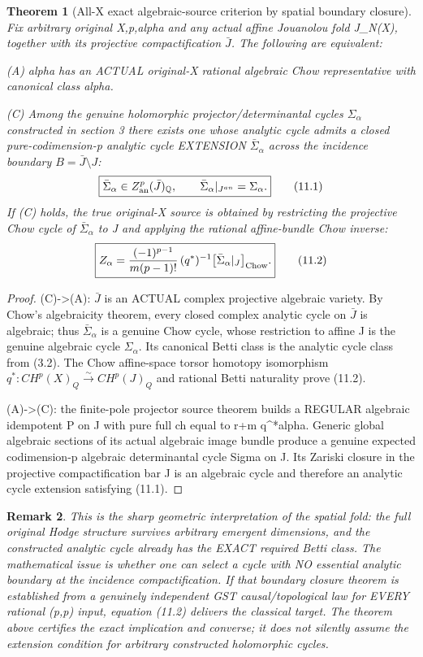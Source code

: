 \documentclass[11pt]{article}
\newtheorem{theorem}{Theorem}[section]
\newtheorem{remark}[theorem]{Remark}
\begin{document}
\begin{theorem}[All-X exact algebraic-source criterion by spatial boundary closure]
Fix arbitrary original X,p,alpha and
any actual affine Jouanolou fold
J_N(X), together with its projective
compactification $\bar J$.
The following are equivalent:

(A) alpha has an ACTUAL
original-X rational algebraic Chow
representative with canonical class alpha.

(C) Among the genuine holomorphic
projector/determinantal cycles
$\Sigma_\alpha$ constructed
in section 3 there exists one
whose analytic cycle admits a
closed pure-codimension-p analytic
cycle EXTENSION $\bar\Sigma_\alpha$
across the incidence boundary
$B=\bar J\setminus J$:
\[
 \boxed{
 \bar\Sigma_\alpha\in Z^p_{\rm an}(\bar J)_{\mathbb Q},
 \qquad
 \bar\Sigma_\alpha|_{J^{an}}
        =\Sigma_\alpha .
 }                                                        \tag{11.1}
\]
If (C) holds, the true original-X
source is obtained by restricting
the projective Chow cycle of
$\bar\Sigma_\alpha$ to J and applying
the rational affine-bundle Chow inverse:
\[
 \boxed{
 Z_\alpha=
 \frac{(-1)^{p-1}}{m(p-1)!}\,
     (q^*)^{-1} \bigl[
       \bar\Sigma_\alpha|_J
     \bigr]_{\rm Chow}.
 }                                                        \tag{11.2}
\]
\end{theorem}
\begin{proof}
(C)->(A): $\bar J$ is an
ACTUAL complex projective algebraic
variety. By Chow's algebraicity
theorem, every closed complex
analytic cycle on $\bar J$ is
algebraic; thus $\bar\Sigma_\alpha$
is a genuine Chow cycle, whose
restriction to affine J is the
genuine algebraic cycle
$\Sigma_\alpha$. Its canonical
Betti class is the analytic
cycle class from (3.2).
The Chow affine-space torsor
homotopy isomorphism
$q^*:CH^p(X)_Q\overset{\sim}\to
 CH^p(J)_Q$ and rational Betti
naturality prove (11.2).

(A)->(C): the finite-pole
projector source theorem builds
a REGULAR algebraic idempotent
P on J with pure full ch
equal to r+m q^*alpha.
Generic global algebraic sections
of its actual algebraic image
bundle produce a genuine expected
codimension-p algebraic
determinantal cycle Sigma on J.
Its Zariski closure in the
projective compactification bar J
is an algebraic cycle and
therefore an analytic cycle
extension satisfying (11.1).
\end{proof}
\begin{remark}
This is the sharp geometric
interpretation of the spatial
fold: the full original Hodge
structure survives arbitrary
emergent dimensions, and the
constructed analytic cycle already
has the EXACT required Betti class.
The mathematical issue is whether
one can select a cycle with NO
essential analytic boundary
at the incidence compactification.
If that boundary closure theorem
is established from a genuinely
independent GST causal/topological
law for EVERY rational (p,p)
input, equation (11.2)
delivers the classical target.
The theorem above certifies the
exact implication and converse;
it does not silently assume the
extension condition for arbitrary
constructed holomorphic cycles.
\end{remark}
\end{document}
